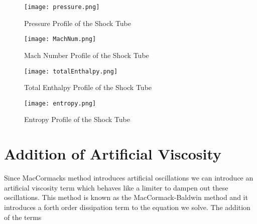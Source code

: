 \documentclass[a4paper,12pt,titlepage]{article}
\newcommand{\scale}{0.5}
\begin{document}
\begin{figure}[H]
  \begin{center}
    \texttt{[image: pressure.png]}
    \caption{Pressure Profile of the Shock Tube}
  \end{center}
\end{figure}

\begin{figure}[H]
  \begin{center}
    \texttt{[image: MachNum.png]}
    \caption{Mach Number Profile of the Shock Tube}
  \end{center}
\end{figure}

\begin{figure}[H]
  \begin{center}
    \texttt{[image: totalEnthalpy.png]}
    \caption{Total Enthalpy Profile of the Shock Tube}
  \end{center}
\end{figure}

\begin{figure}[H]
  \begin{center}
    \texttt{[image: entropy.png]}
    \caption{Entropy Profile of the Shock Tube}
  \end{center}
\end{figure}

\section{Addition of Artificial Viscosity}

Since MacCormacks method introduces artificial oscillations we can introduce an artificial viscosity term which behaves like a limiter to dampen out these oscillations.  This method is known as the MacCormack-Baldwin method and it introduces a forth order dissipation term to the equation we solve.  The addition of the terms 
\end{document}
